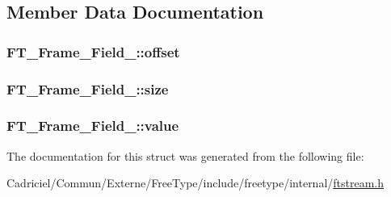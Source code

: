 \subsection{Member Data Documentation}
\hypertarget{struct_f_t___frame___field___a85c3275fbb7044f7d6880020b6f0f794}{
\subsubsection[{offset}]{ F\-T\-\_\-\-Frame\-\_\-\-Field\-\_\-\-::offset}}\label{struct_f_t___frame___field___a85c3275fbb7044f7d6880020b6f0f794}
\hypertarget{struct_f_t___frame___field___a47e6fbcb90c079421d9d9b64f63a587e}{
\subsubsection[{size}]{ F\-T\-\_\-\-Frame\-\_\-\-Field\-\_\-\-::size}}\label{struct_f_t___frame___field___a47e6fbcb90c079421d9d9b64f63a587e}
\hypertarget{struct_f_t___frame___field___a10f91dcdd0a582727b67ad45d42bab41}{
\subsubsection[{value}]{ F\-T\-\_\-\-Frame\-\_\-\-Field\-\_\-\-::value}}\label{struct_f_t___frame___field___a10f91dcdd0a582727b67ad45d42bab41}


The documentation for this struct was generated from the following file\-:\begin{DoxyCompactItemize}
\item 
Cadriciel/\-Commun/\-Externe/\-Free\-Type/include/freetype/internal/\hyperlink{ftstream_8h}{ftstream.\-h}\end{DoxyCompactItemize}
